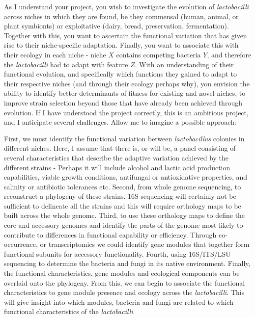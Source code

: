 \documentclass[letterpaper, 10pt]{article} %
\begin{document}
\begin{tcolorbox}[
	blanker,
	width=0.90\textwidth,
	enlarge left by=0.05\textwidth,
	enlarge right by=0.05\textwidth,
	before skip=6pt,
	breakable]
As I understand your project, you wish to investigate the evolution of \textit{lactobacilli} across niches in which they are found, be they commensal (human, animal, or plant symbionts) or exploitative (dairy, bread, preservation, fermentation). Together with this, you want to ascertain the functional variation that has given rise to their niche-specific adaptation. Finally, you want to associate this with their ecology in each niche - niche $X$ contains competing bacteria $Y$, and therefore the \textit{lactobacilli} had to adapt with feature $Z$. With an understanding of their functional evolution, and specifically which functions they gained to adapt to their respective niches (and through their ecology perhaps why), you envision the ability to identify better determinants of fitness for existing and novel niches, to improve strain selection beyond those that have already been achieved through evolution. If I have understood the project correctly, this is an ambitious project, and I anticipate several challenges. Allow me to imagine a possible approach:

First, we must identify the functional variation between \textit{lactobacillus} colonies in different niches. Here, I assume that there is, or will be, a panel consisting of several characteristics that describe the adaptive variation achieved by the different strains - Perhaps it will include alcohol and lactic acid production capabilities, viable growth conditions, antifungal or antioxidative properties, and salinity or antibiotic tolerances etc. Second, from whole genome sequencing, to reconstruct a phylogeny of these strains. 16S sequencing will certainly not be sufficient to delineate all the strains and this will require orthology maps to be built across the whole genome. Third, to use these orthology maps to define the core and accessory genomes and identify the parts of the genome most likely to contribute to differences in functional capability or efficiency. Through co-occurrence, or transcriptomics we could identify gene modules that together form functional subunits for accessory functionality. Fourth, using 16S/ITS/LSU sequencing to determine the bacteria and fungi in its native environment. Finally, the functional characteristics, gene modules and ecological components can be overlaid onto the phylogeny. From this, we can begin to associate the functional characteristics to gene module presence and ecology across the \textit{lactobacilli}. This will give insight into which modules, bacteria and fungi are related to which functional characteristics of the \textit{lactobacilli}.


\end{tcolorbox}
\end{document}

